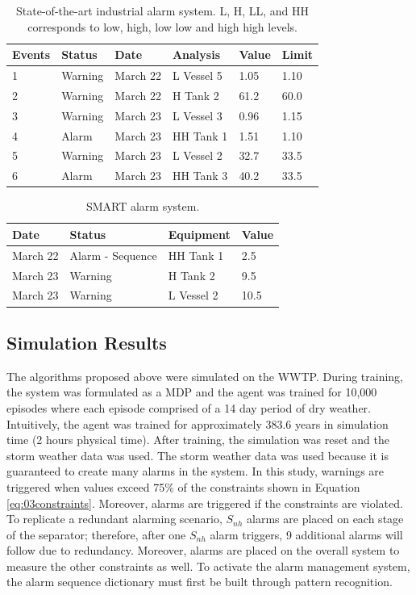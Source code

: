 \begin{table}[H]
	\centering
	\begin{tabular}{P{1.1cm}|P{2.1cm}|P{2.1cm}|P{2.5cm}|P{2cm}|P{2cm}}
	Events & Status & Date & Analysis & Value & Limit \\  & Warning & March 22 & L Vessel 5 & 1.05 & 1.10 \\
	2 & Warning & March 22 & H Tank 2 & 61.2 & 60.0 \\
	3 & Warning & March 23 & L Vessel 3 & 0.96 & 1.15 \\
	4 & Alarm & March 23 & HH Tank 1 & 1.51 & 1.10 \\
	5 & Warning & March 23 & L Vessel 2 & 32.7 & 33.5 \\ 
	6 & Alarm & March 23 & HH Tank 3 & 40.2 & 33.5 \\
	\end{tabular}
	\caption{State-of-the-art industrial alarm system. L, H, LL, and HH corresponds to low, high, low low and high high levels.}
	\label{alg:03norm_system}
\end{table}

\begin{table}[H]
	\centering
	\begin{tabular}{P{2.5cm}|P{4.5cm}|P{2.5cm}|P{2.5cm}}
	Date & Status & Equipment &  Value\\ \hline
	March 22 & Alarm - Sequence & HH Tank 1 & 2.5\\
	March 23 & Warning & H Tank 2 &  9.5  \\
	March 23 & Warning & L Vessel 2 &  10.5 \\
	\end{tabular}
	\caption{SMART alarm system.}
	\label{alg:03SMARTalarm}
\end{table}

\subsection{Simulation Results}

The algorithms proposed above were simulated on the WWTP.  During training, the system was formulated as a MDP and the agent was trained for 10,000 episodes where each episode comprised of a 14 day period of dry weather.  Intuitively, the agent was trained for approximately 383.6 years in simulation time (2 hours physical time).  After training, the simulation was reset and the storm weather data was used.  The storm weather data was used because it is guaranteed to create many alarms in the system. In this study, warnings are triggered when values exceed 75\% of the constraints shown in Equation \ref{eq:03constraints}.  Moreover, alarms are triggered if the constraints are violated. To replicate a redundant alarming scenario, $S_{nh}$ alarms are placed on each stage of the separator; therefore, after one $S_{nh}$ alarm triggers, 9 additional alarms will follow due to redundancy.  Moreover, alarms are placed on the overall system to measure the other constraints as well.  To activate the alarm management system, the alarm sequence dictionary must first be built through pattern recognition.

